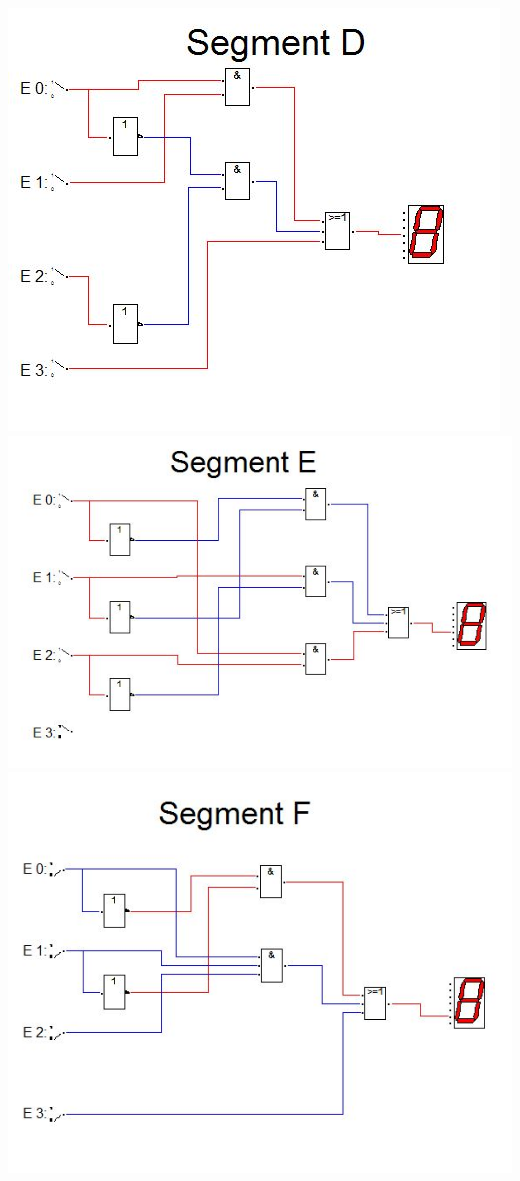 \documentclass[a4paper, 11pt, fleqn, DIV=10, twoside, BCOR=10mm]{scrreprt}
\begin{document}
\begin{center}
\vspace{10mm}
\includegraphics[width=0.75\columnwidth]{DT4Graphics/Segment_D.jpg}
\includegraphics[width=0.8\columnwidth]{DT4Graphics/Segment_E.jpg}
\vspace{10mm}
\includegraphics[width=0.75\columnwidth]{DT4Graphics/Segment_F.jpg}

\end{center}
\end{document}
